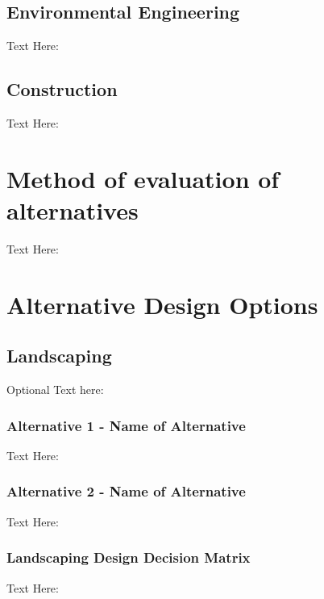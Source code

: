 \documentclass{ceri}
\begin{document}
\subsection{Environmental Engineering}
Text Here:

\subsection{Construction}
Text Here:

\section{Method of evaluation of alternatives}
Text Here:

\section{Alternative Design Options}
\subsection{Landscaping}
Optional Text here:

\subsubsection{Alternative 1 - Name of Alternative}
Text Here:

\subsubsection{Alternative 2 - Name of Alternative}
Text Here:

\subsubsection{Landscaping Design Decision Matrix}
Text Here:

\begin{table}[H]
\centering
\caption{Landscaping Design Decision Matrix}
\label{my-label}
\end{table}
\end{document}
